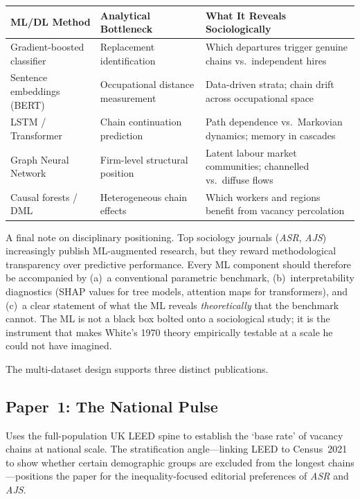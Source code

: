 \documentclass[a4paper]{tufte-handout}
\begin{document}
\begin{fullwidth}
	\smallskip
	\small
	\begin{tabularx}{\linewidth}{@{}l l X@{}}
		\toprule
		\textbf{ML/DL Method}       & \textbf{Analytical Bottleneck}    & \textbf{What It Reveals Sociologically}                         \\
		\midrule
		Gradient-boosted classifier & Replacement identification        & Which departures trigger genuine chains vs.\ independent hires  \\[3pt]
		Sentence embeddings (BERT)  & Occupational distance measurement & Data-driven strata; chain drift across occupational space       \\[3pt]
		LSTM / Transformer          & Chain continuation prediction     & Path dependence vs.\ Markovian dynamics; memory in cascades     \\[3pt]
		Graph Neural Network        & Firm-level structural position    & Latent labour market communities; channelled vs.\ diffuse flows \\[3pt]
		Causal forests / DML        & Heterogeneous chain effects       & Which workers and regions benefit from vacancy percolation      \\
		\bottomrule
	\end{tabularx}
	\smallskip
\end{fullwidth}

A final note on disciplinary positioning. Top sociology journals (\emph{ASR}, \emph{AJS}) increasingly publish ML-augmented research, but they reward methodological transparency over predictive performance. Every ML component should therefore be accompanied by (a)~a conventional parametric benchmark, (b)~interpretability diagnostics (SHAP values for tree models, attention maps for transformers), and (c)~a clear statement of what the ML reveals \emph{theoretically} that the benchmark cannot. The ML is not a black box bolted onto a sociological study; it is the instrument that makes White's 1970 theory empirically testable at a scale he could not have imagined.



The multi-dataset design supports three distinct publications.

\subsection{Paper~1: The National Pulse}
Uses the full-population UK LEED spine to establish the `base rate' of vacancy chains at national scale. The stratification angle---linking LEED to Census~2021 to show whether certain demographic groups are excluded from the longest chains---positions the paper for the inequality-focused editorial preferences of \emph{ASR} and \emph{AJS}.
\end{document}
